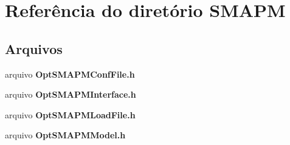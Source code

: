 \section{Referência do diretório S\+M\+A\+PM}
\label{dir_8548d42b8ad27dbd593bd900a3d57b20}
\subsection*{Arquivos}
\begin{DoxyCompactItemize}
\item 
arquivo {\bf Opt\+S\+M\+A\+P\+M\+Conf\+File.\+h}
\item 
arquivo {\bf Opt\+S\+M\+A\+P\+M\+Interface.\+h}
\item 
arquivo {\bf Opt\+S\+M\+A\+P\+M\+Load\+File.\+h}
\item 
arquivo {\bf Opt\+S\+M\+A\+P\+M\+Model.\+h}
\end{DoxyCompactItemize}

